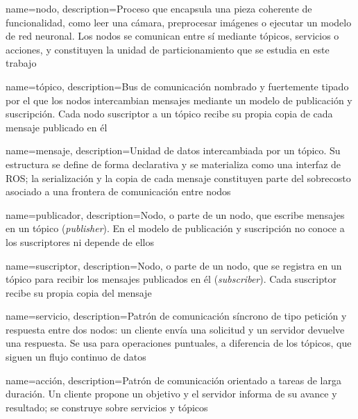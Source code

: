 
{
    name={nodo},
    description={Proceso que encapsula una pieza coherente de funcionalidad,
    como leer una cámara, preprocesar imágenes o ejecutar un modelo de red
    neuronal. Los nodos se comunican entre sí mediante tópicos, servicios o
    acciones, y constituyen la unidad de particionamiento que se estudia en
    este trabajo}
}

{
    name={tópico},
    description={Bus de comunicación nombrado y fuertemente tipado por el que
    los nodos intercambian mensajes mediante un modelo de publicación y
    suscripción. Cada nodo suscriptor a un tópico recibe su propia copia de
    cada mensaje publicado en él}
}

{
    name={mensaje},
    description={Unidad de datos intercambiada por un tópico. Su estructura se
    define de forma declarativa y se materializa como una interfaz de ROS; la
    serialización y la copia de cada mensaje constituyen parte del sobrecosto
    asociado a una frontera de comunicación entre nodos}
}

{
    name={publicador},
    description={Nodo, o parte de un nodo, que escribe mensajes en un tópico
    (\emph{publisher}). En el modelo de publicación y suscripción no conoce a
    los suscriptores ni depende de ellos}
}

{
    name={suscriptor},
    description={Nodo, o parte de un nodo, que se registra en un tópico para
    recibir los mensajes publicados en él (\emph{subscriber}). Cada suscriptor
    recibe su propia copia del mensaje}
}

{
    name={servicio},
    description={Patrón de comunicación síncrono de tipo petición y respuesta
    entre dos nodos: un cliente envía una solicitud y un servidor devuelve una
    respuesta. Se usa para operaciones puntuales, a diferencia de los tópicos,
    que siguen un flujo continuo de datos}
}

{
    name={acción},
    description={Patrón de comunicación orientado a tareas de larga duración.
    Un cliente propone un objetivo y el servidor informa de su avance y
    resultado; se construye sobre servicios y tópicos}
}

